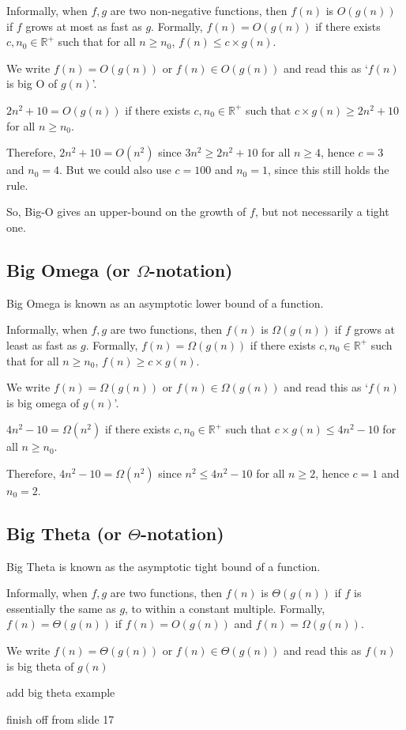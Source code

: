 Informally, when $f, g$ are two non-negative functions, then $f(n)$ is $O(g(n))$ if $f$ grows at most as fast as $g$.
 Formally, $f(n) = O(g(n))$ if there exists $c, n_0 \in \mathbb{R}^+$ such that for all $n \geq n_0$,
 $f(n) \leq c \times g(n)$.

We write $f(n) = O(g(n))$ or $f(n) \in O(g(n))$ and read this as `$f(n)$ is big O of $g(n)$'.

\begin{example*}{}{}
  $2n^2 + 10 = O(g(n))$ if there exists $c, n_0 \in \mathbb{R}^+$ such that $c \times g(n) \geq 2n^2 + 10$ for all
   $n \geq n_0$.

  Therefore, $2n^2 + 10 = O(n^2)$ since $3n^2 \geq 2n^2 + 10$ for all $n \geq 4$, hence $c = 3$ and $n_0 = 4$. But we
   could also use $c = 100$ and $n_0 = 1$, since this still holds the rule.
\end{example*}

So, Big-O gives an upper-bound on the growth of $f$, but not necessarily a tight one.

\subsection*{Big Omega (or $\Omega$-notation)}

Big Omega is known as an asymptotic lower bound of a function.

Informally, when $f, g$ are two functions, then $f(n)$ is $\Omega(g(n))$ if $f$ grows at least as fast as $g$.
 Formally, $f(n) = \Omega(g(n))$ if there exists $c, n_0 \in \mathbb{R}^+$ such that for all $n \geq n_0$,
 $f(n) \geq c \times g(n)$.

We write $f(n) = \Omega(g(n))$ or $f(n) \in \Omega(g(n))$ and read this as `$f(n)$ is big omega of $g(n)$'.

\begin{example*}{}{}
  $4n^2 - 10 = \Omega(n^2)$ if there exists $c, n_0 \in \mathbb{R}^+$ such that $c \times g(n) \leq 4n^2 - 10$ for all
   $n \geq n_0$.

  Therefore, $4n^2 - 10 = \Omega(n^2)$ since $n^2 \leq 4n^2 - 10$ for all $n \geq 2$, hence $c = 1$ and $n_0 = 2$.
\end{example*}

\subsection*{Big Theta (or $\Theta$-notation)}

Big Theta is known as the asymptotic tight bound of a function.

Informally, when $f, g$ are two functions, then $f(n)$ is $\Theta(g(n))$ if $f$ is essentially the same as $g$, to
 within a constant multiple. Formally, $f(n) = \Theta(g(n))$ if $f(n) = O(g(n))$ and $f(n) = \Omega(g(n))$.

We write $f(n) = \Theta(g(n))$ or $f(n) \in \Theta(g(n))$ and read this as $f(n)$ is big theta of $g(n)$

\begin{example*}{}{}
  \huge add big theta example
\end{example*}

{\huge finish off from slide 17}